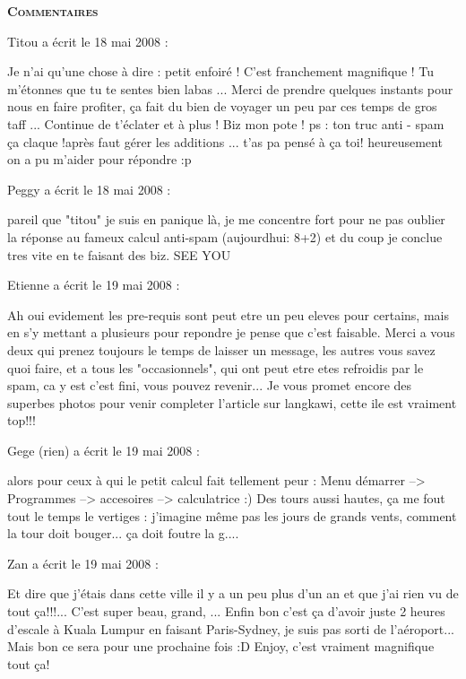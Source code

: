 \bigskip
\textbf{\textsc{Commentaires}}

\medskip
Titou a écrit le 18 mai 2008 :
\begin{displayquote}
Je n'ai qu'une chose à dire : petit enfoiré ! C'est franchement magnifique ! Tu m'étonnes que tu te sentes bien labas ... Merci de prendre quelques instants pour nous en faire profiter, ça fait du bien de voyager un peu par ces temps de gros taff ... Continue de t'éclater et à plus ! Biz mon pote !
ps : ton truc anti - spam ça claque !après faut gérer les additions ... t'as pa pensé à ça toi! heureusement on a pu m'aider pour répondre :p
\end{displayquote}

\medskip
Peggy a écrit le 18 mai 2008 :
\begin{displayquote}
pareil que "titou" je suis en panique là, je me concentre fort pour ne pas oublier la réponse au fameux calcul anti-spam (aujourdhui: 8+2) et du coup je conclue tres vite en te faisant des biz.
SEE YOU
\end{displayquote}

\medskip
Etienne a écrit le 19 mai 2008 :
\begin{displayquote}
Ah oui evidement les pre-requis sont peut etre un peu eleves pour certains, mais en s'y mettant a plusieurs pour repondre je pense que c'est faisable.
Merci a vous deux qui prenez toujours le temps de laisser un message, les autres vous savez quoi faire, et a tous les "occasionnels", qui ont peut etre etes refroidis par le spam, ca y est c'est fini, vous pouvez revenir...
Je vous promet encore des superbes photos pour venir completer l'article sur langkawi, cette ile est vraiment top!!!
\end{displayquote}

\medskip
Gege (rien) a écrit le 19 mai 2008 :
\begin{displayquote}
alors pour ceux à qui le petit calcul fait tellement peur : Menu démarrer --> Programmes --> accesoires --> calculatrice :)
Des tours aussi hautes, ça me fout tout le temps le vertiges : j'imagine même pas les jours de grands vents, comment la tour doit bouger... ça doit foutre la g....
\end{displayquote}

\medskip
Zan a écrit le 19 mai 2008 :
\begin{displayquote}
Et dire que j'étais dans cette ville il y a un peu plus d'un an et que j'ai rien vu de tout ça!!!... C'est super beau, grand, ...
Enfin bon c'est ça d'avoir juste 2 heures d'escale à Kuala Lumpur en faisant Paris-Sydney, je suis pas sorti de l'aéroport... Mais bon ce sera pour une prochaine fois :D
Enjoy, c'est vraiment magnifique tout ça!
\end{displayquote}

